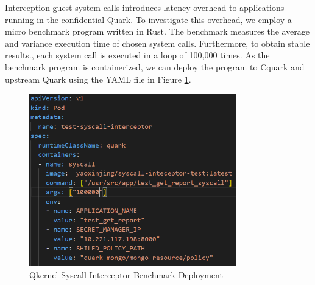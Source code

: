 Interception guest system calls introduces latency overhead to applications running in the confidential Quark.  To investigate this overhead, we employ a micro benchmark program written in Rust\cite*{benchamark_systemcall_intercetion}.  The benchmark measures the average and variance execution 
time of chosen system calls. Furthermore, to obtain stable results., each system call is executed in a loop of 100,000 times. As the benchmark program is containerized, we can deploy the program to Cquark and upstream Quark using the YAML file in Figure \ref{fig:syscall_interceptor_yaml}.
\begin{figure}[H]
    \centering
    \includegraphics[width=0.8\textwidth]{images/perf_system_call_interceptor_yaml.PNG}
    \caption[Qkernel Syscall Interceptor Benchmark Deployment]{Qkernel Syscall Interceptor Benchmark Deployment}
    \label{fig:syscall_interceptor_yaml}
\end{figure}


